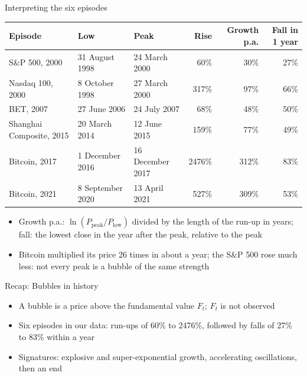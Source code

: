 \begin{frame}{Interpreting the six episodes}
\itemsize{\footnotesize}
\setlength{\tabcolsep}{4pt}\begin{center}
\scriptsize
\begin{tabular}{lllrrr}
\toprule
\textbf{Episode} & \textbf{Low} & \textbf{Peak} & \textbf{Rise} & \textbf{Growth p.a.} & \textbf{Fall in 1 year} \\
\midrule
S\&P 500, 2000 & 31 August 1998 & 24 March 2000 & 60\% & 30\% & 27\% \\
Nasdaq 100, 2000 & 8 October 1998 & 27 March 2000 & 317\% & 97\% & 66\% \\
BET, 2007 & 27 June 2006 & 24 July 2007 & 68\% & 48\% & 50\% \\
Shanghai Composite, 2015 & 20 March 2014 & 12 June 2015 & 159\% & 77\% & 49\% \\
Bitcoin, 2017 & 1 December 2016 & 16 December 2017 & 2476\% & 312\% & 83\% \\
Bitcoin, 2021 & 8 September 2020 & 13 April 2021 & 527\% & 309\% & 53\% \\
\bottomrule
\end{tabular}
\end{center}
\begin{itemize}
    \item Growth p.a.: $\ln(P_{\text{peak}}/P_{\text{low}})$ divided by the length of the run-up in years; fall: the lowest close in the year after the peak, relative to the peak
    \item Bitcoin multiplied its price 26 times in about a year; the S\&P 500 rose much less: not every peak is a bubble of the same strength
\end{itemize}
\end{frame}

\begin{frame}{Recap: Bubbles in history}
\itemsize{\small}
\begin{itemize}
    \item A bubble is a price above the fundamental value $F_t$; $F_t$ is not observed
    \item Six episodes in our data: run-ups of 60\% to 2476\%, followed by falls of 27\% to 83\% within a year
    \item Signatures: explosive and super-exponential growth, accelerating oscillations, then an end
\end{itemize}
\end{frame}


